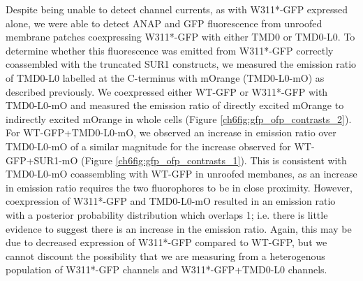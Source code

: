Despite being unable to detect channel currents, as with W311*-GFP expressed alone, we were able to detect ANAP and GFP fluorescence from unroofed membrane patches coexpressing W311*-GFP with either TMD0 or TMD0-L0.
To determine whether this fluorescence was emitted from W311*-GFP correctly coassembled with the truncated SUR1 constructs, we measured the emission ratio of TMD0-L0 labelled at the C-terminus with mOrange (TMD0-L0-mO) as described previously.
We coexpressed either WT-GFP or W311*-GFP with TMD0-L0-mO and measured the emission ratio of directly excited mOrange to indirectly excited mOrange in whole cells (Figure \ref{ch6fig:gfp_ofp_contrasts_2}).
For WT-GFP+TMD0-L0-mO, we observed an increase in emission ratio over TMD0-L0-mO of a similar magnitude for the increase observed for WT-GFP+SUR1-mO (Figure \ref{ch6fig:gfp_ofp_contrasts_1}).
This is consistent with TMD0-L0-mO coassembling with WT-GFP in unroofed membanes, as an increase in emission ratio requires the two fluorophores to be in close proximity.
However, coexpression of W311*-GFP and TMD0-L0-mO resulted in an emission ratio with a posterior probability distribution which overlaps 1; i.e. there is little evidence to suggest there is an increase in the emission ratio.
Again, this may be due to decreased expression of W311*-GFP compared to WT-GFP, but we cannot discount the possibility that we are measuring from a heterogenous population of W311*-GFP channels and W311*-GFP+TMD0-L0 channels.

